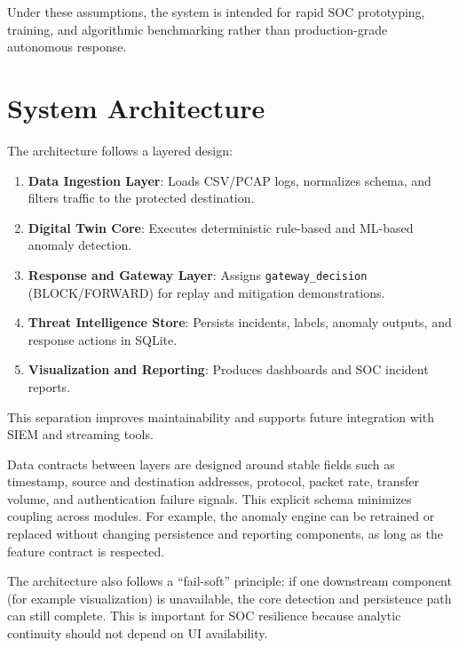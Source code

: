 \documentclass[conference]{IEEEtran}
\begin{document}
Under these assumptions, the system is intended for rapid SOC prototyping, training, and algorithmic benchmarking rather than production-grade autonomous response.

\section{System Architecture}
The architecture follows a layered design:
\begin{enumerate}
    \item \textbf{Data Ingestion Layer}: Loads CSV/PCAP logs, normalizes schema, and filters traffic to the protected destination.
    \item \textbf{Digital Twin Core}: Executes deterministic rule-based and ML-based anomaly detection.
    \item \textbf{Response and Gateway Layer}: Assigns \texttt{gateway\_decision} (BLOCK/FORWARD) for replay and mitigation demonstrations.
    \item \textbf{Threat Intelligence Store}: Persists incidents, labels, anomaly outputs, and response actions in SQLite.
    \item \textbf{Visualization and Reporting}: Produces dashboards and SOC incident reports.
\end{enumerate}

This separation improves maintainability and supports future integration with SIEM and streaming tools.

Data contracts between layers are designed around stable fields such as timestamp, source and destination addresses, protocol, packet rate, transfer volume, and authentication failure signals. This explicit schema minimizes coupling across modules. For example, the anomaly engine can be retrained or replaced without changing persistence and reporting components, as long as the feature contract is respected.

The architecture also follows a ``fail-soft'' principle: if one downstream component (for example visualization) is unavailable, the core detection and persistence path can still complete. This is important for SOC resilience because analytic continuity should not depend on UI availability.
\end{document}
